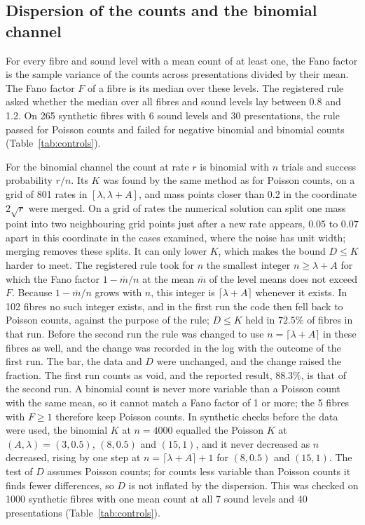 \documentclass[10pt,letterpaper]{article}
\begin{document}
\subsection{Dispersion of the counts and the binomial channel}
For every fibre and sound level with a mean count of at least one, the Fano factor is the sample variance of the counts across
presentations divided by their mean. The Fano factor $F$ of a fibre is its median over these levels. The registered rule asked whether
the median over all fibres and sound levels lay between 0.8 and 1.2. On 265 synthetic fibres with 6 sound levels and 30 presentations, the rule
passed for Poisson counts and failed for negative binomial and binomial counts (Table~\ref{tab:controls}).

For the binomial channel the count at rate $r$ is binomial with $n$ trials and success probability $r/n$. Its $K$ was found by the
same method as for Poisson counts, on a grid of 801 rates in $[\lambda,\lambda+A]$, and mass points closer than 0.2 in the
coordinate $2\sqrt r$ were merged. On a grid of rates the numerical solution can split one mass point into two neighbouring grid
points just after a new rate appears, $0.05$ to $0.07$ apart in this coordinate in the cases examined, where the noise has unit width; merging removes these
splits. It can only lower $K$, which makes the bound $D\le K$ harder to meet. The registered rule took for $n$ the smallest integer $n\ge\lambda+A$ for which the Fano factor
$1-\bar m/n$ at the mean $\bar m$ of the level means does not exceed $F$. Because $1-\bar m/n$ grows with $n$, this integer is
$\lceil\lambda+A\rceil$ whenever it exists. In 102 fibres no such integer exists, and in the first run the code then fell back to
Poisson counts, against the purpose of the rule; $D\le K$ held in $72.5\%$ of fibres in that run. Before the second run the rule was
changed to use $n=\lceil\lambda+A\rceil$ in these fibres as well, and the change was recorded in the log with the outcome of the
first run. The bar, the data and $D$ were unchanged, and the change raised the fraction. The first run counts as void, and
the reported result, $88.3\%$, is that of the second run. A binomial count is never more variable than a Poisson count
with the same mean, so it cannot match a Fano factor of 1 or more; the 5 fibres with $F\ge1$ therefore keep Poisson counts. In synthetic checks before the data were used, the binomial $K$ at $n=4000$ equalled the Poisson $K$ at
$(A,\lambda)=(3,0.5)$, $(8,0.5)$ and $(15,1)$, and it never decreased as $n$ decreased, rising by one step at
$n=\lceil\lambda+A\rceil+1$ for $(8,0.5)$ and $(15,1)$. The test of $D$ assumes Poisson counts; for counts less variable than Poisson
counts it finds fewer differences, so $D$ is not inflated by the dispersion. This was checked on 1000 synthetic fibres with one mean
count at all 7 sound levels and 40 presentations (Table~\ref{tab:controls}).
\end{document}
